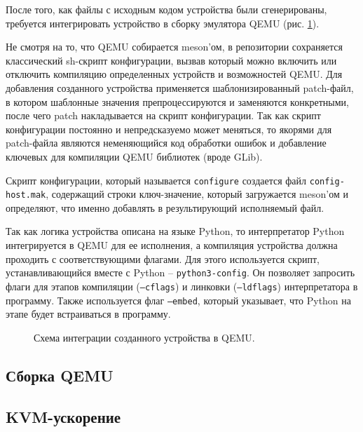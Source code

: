 После того, как файлы с исходным кодом устройства были сгенерированы, требуется
интегрировать устройство в сборку эмулятора QEMU (рис. \ref{fig:qemu-compilation}).

Не смотря на то, что QEMU собирается meson'ом, в репозитории сохраняется
классический sh-скрипт конфигурации, вызвав который можно включить
или отключить компиляцию определенных устройств и возможностей QEMU.
Для добавления созданного устройства применяется шаблонизированный patch-файл,
в котором шаблонные значения препроцессируются и заменяются конкретными,
после чего patch накладывается на скрипт конфигурации.
Так как скрипт конфигурации постоянно и непредсказуемо может меняться,
то якорями для patch-файла являются неменяющийся код обработки ошибок
и добавление ключевых для компиляции QEMU библиотек (вроде GLib).

Скрипт конфигурации, который называется \texttt{configure} создается
файл \texttt{config-host.mak}, содержащий строки ключ-значение,
который загружается meson'ом и определяют, что именно добавлять в
результирующий исполняемый файл.

Так как логика устройства описана на языке Python, то интерпретатор Python
интегрируется в QEMU для ее исполнения, а компиляция устройства должна
проходить с соответствующими флагами. Для этого используется
скрипт, устанавливающийся вместе с Python -- \texttt{python3-config}.
Он позволяет запросить флаги для этапов компиляции (\texttt{--cflags})
и линковки (\texttt{--ldflags}) интерпретатора в программу.
Также используется флаг \texttt{--embed}, который указывает,
что Python на этапе будет встраиваться в программу.

\begin{figure}[!htbp]
    \centering
    
    \caption{Схема интеграции созданного устройства в QEMU.}\label{fig:qemu-compilation}
\end{figure}

\subsection{Сборка QEMU}\label{sec:ch2/sec1/sub8}

\subsection{KVM-ускорение}\label{sec:ch2/sec1/sub9}
